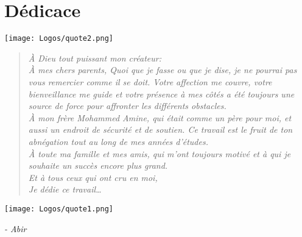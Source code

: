 \chapter*{Dédicace}



\newcommand{\dedicationquote}[1]{%
    \begin{quote}
    \begin{center}
        \large\itshape\color{dedicationquote}
        #1
    \end{center}
    \end{quote}
}


\newcommand{\signature}[1]{%
    \begin{flushright}
        \color{signature}
        \emph{#1}
    \end{flushright}
}
\vspace{1cm}
\hspace{0.4cm}
\texttt{[image: Logos/quote2.png]}
\hspace{5cm}
    
\dedicationquote{ À Dieu tout puissant mon créateur:\\[0.3cm]
À mes chers parents, Quoi que je fasse ou que je dise, je ne pourrai pas vous remercier comme il se doit. Votre affection me couvre, votre bienveillance me guide et votre présence à mes côtés a été toujours une source de force pour affronter les différents obstacles.\\[0.3cm]
À mon frère Mohammed Amine, qui était comme un père pour moi, et aussi un endroit de sécurité et de soutien. Ce travail est le fruit de ton abnégation tout au long de mes années d’études.\\[0.3cm]
À toute ma famille et mes amis, qui m’ont toujours motivé et à qui je souhaite un succès encore plus grand.\\[0.3cm]
Et à tous ceux qui ont cru en moi,\\[0.3cm]
Je dédie ce travail…\\
}


\hspace{15cm}
\texttt{[image: Logos/quote1.png]}
\vspace{1cm}
\signature{- Abir}


